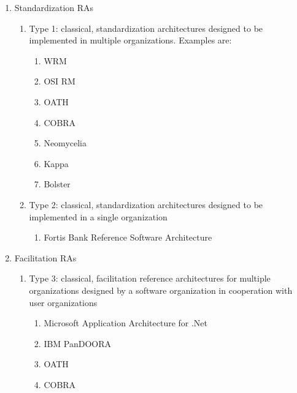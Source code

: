 \documentclass[review]{elsarticle}
\begin{document}
\begin{enumerate}

    \item Standardization RAs

    \begin{enumerate}
      \item Type 1: classical, standardization architectures designed to be implemented in multiple organizations. Examples are:

      \begin{enumerate}
        \item WRM \cite{hollingsworth1995workflow}
        \item OSI RM \cite{zimmermann1980osi}
        \item OATH \cite{OATH}
        \item COBRA \cite{pope1998corba}
        \item Neomycelia \cite{AtaeiApsec}
        \item Kappa \cite{kreps2014questioning}
        \item Bolster \cite{Nadal}
      \end{enumerate}

      \item Type 2: classical, standardization architectures designed to be implemented in a single organization
      \begin{enumerate}
          \item Fortis Bank Reference Software Architecture \cite{angelov2009classification}
      \end{enumerate}
    \end{enumerate}

    \item Facilitation  RAs
    \begin{enumerate}
        \item Type 3: classical, facilitation reference architectures for multiple organizations designed by a software organization in cooperation with user organizations
        \begin{enumerate}
            \item Microsoft Application Architecture for .Net  \cite{microsoft2002application}
            \item IBM PanDOORA
            \item OATH \cite{OATH}
            \item COBRA \cite{pope1998corba}
        \end{enumerate}


\end{enumerate}
\end{enumerate}
\end{document}

